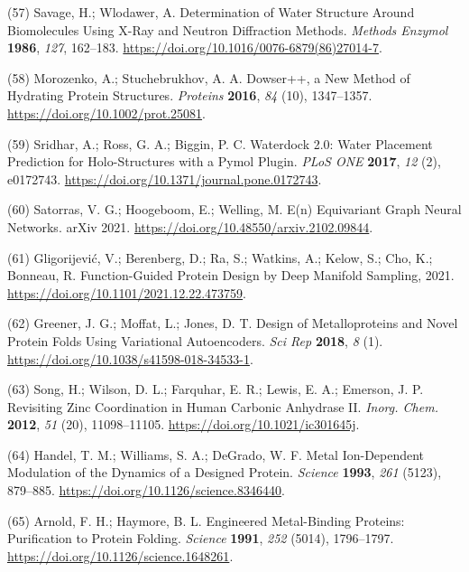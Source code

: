 \documentclass[ lineno,
  9pt]{elife}
\newenvironment{cslreferences}%
  {}%
  {\par}
\begin{document}
\begin{cslreferences}
\leavevmode\hypertarget{ref-NifwNdQd}{}%
(57) Savage, H.; Wlodawer, A. Determination of Water Structure Around Biomolecules Using X-Ray and Neutron Diffraction Methods. \emph{Methods Enzymol} \textbf{1986}, \emph{127}, 162--183. \url{https://doi.org/10.1016/0076-6879(86)27014-7}.

\leavevmode\hypertarget{ref-10C4imKQR}{}%
(58) Morozenko, A.; Stuchebrukhov, A. A. Dowser++, a New Method of Hydrating Protein Structures. \emph{Proteins} \textbf{2016}, \emph{84} (10), 1347--1357. \url{https://doi.org/10.1002/prot.25081}.

\leavevmode\hypertarget{ref-izkvZoLX}{}%
(59) Sridhar, A.; Ross, G. A.; Biggin, P. C. Waterdock 2.0: Water Placement Prediction for Holo-Structures with a Pymol Plugin. \emph{PLoS ONE} \textbf{2017}, \emph{12} (2), e0172743. \url{https://doi.org/10.1371/journal.pone.0172743}.

\leavevmode\hypertarget{ref-Fc42fl1x}{}%
(60) Satorras, V. G.; Hoogeboom, E.; Welling, M. E(n) Equivariant Graph Neural Networks. arXiv 2021. \url{https://doi.org/10.48550/arxiv.2102.09844}.

\leavevmode\hypertarget{ref-cbwvbkS6}{}%
(61) Gligorijević, V.; Berenberg, D.; Ra, S.; Watkins, A.; Kelow, S.; Cho, K.; Bonneau, R. Function-Guided Protein Design by Deep Manifold Sampling, 2021. \url{https://doi.org/10.1101/2021.12.22.473759}.

\leavevmode\hypertarget{ref-Gj0pG9O5}{}%
(62) Greener, J. G.; Moffat, L.; Jones, D. T. Design of Metalloproteins and Novel Protein Folds Using Variational Autoencoders. \emph{Sci Rep} \textbf{2018}, \emph{8} (1). \url{https://doi.org/10.1038/s41598-018-34533-1}.

\leavevmode\hypertarget{ref-TlDhIlX}{}%
(63) Song, H.; Wilson, D. L.; Farquhar, E. R.; Lewis, E. A.; Emerson, J. P. Revisiting Zinc Coordination in Human Carbonic Anhydrase II. \emph{Inorg. Chem.} \textbf{2012}, \emph{51} (20), 11098--11105. \url{https://doi.org/10.1021/ic301645j}.

\leavevmode\hypertarget{ref-RJ44nj3R}{}%
(64) Handel, T. M.; Williams, S. A.; DeGrado, W. F. Metal Ion-Dependent Modulation of the Dynamics of a Designed Protein. \emph{Science} \textbf{1993}, \emph{261} (5123), 879--885. \url{https://doi.org/10.1126/science.8346440}.

\leavevmode\hypertarget{ref-15drt0nXZ}{}%
(65) Arnold, F. H.; Haymore, B. L. Engineered Metal-Binding Proteins: Purification to Protein Folding. \emph{Science} \textbf{1991}, \emph{252} (5014), 1796--1797. \url{https://doi.org/10.1126/science.1648261}.


\end{cslreferences}
\end{document}
